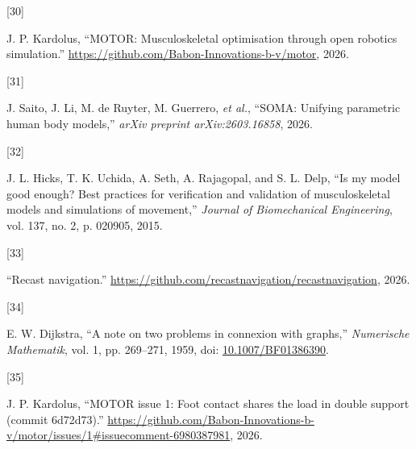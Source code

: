\documentclass[
  11pt,
]{article}
\newlength{\cslhangindent}
\newlength{\csllabelwidth}
\newenvironment{CSLReferences}[2] %
 {\begin{list}{}{%
  \setlength{\itemindent}{0pt}
  \setlength{\leftmargin}{0pt}
  \setlength{\parsep}{0pt}
  \ifodd #1
   \setlength{\leftmargin}{\cslhangindent}
   \setlength{\itemindent}{-1\cslhangindent}
  \fi
  \setlength{\itemsep}{#2\baselineskip}}}
 {\end{list}}
\newcommand{\CSLLeftMargin}[1]{\parbox[t]{\csllabelwidth}{\strut#1\strut}}
\newcommand{\CSLRightInline}[1]{\parbox[t]{\linewidth - \csllabelwidth}{\strut#1\strut}}
\begin{document}
\begin{CSLReferences}{0}{0}
\CSLLeftMargin{{[}30{]} }%
\CSLRightInline{J. P. Kardolus, {``{MOTOR}: Musculoskeletal optimisation
through open robotics simulation.''}
\url{https://github.com/Babon-Innovations-b-v/motor}, 2026.}

\CSLLeftMargin{{[}31{]} }%
\CSLRightInline{{J. Saito, J. Li, M. de Ruyter, M. Guerrero, \emph{et
al.}}, {``{SOMA}: Unifying parametric human body models,''} \emph{arXiv
preprint arXiv:2603.16858}, 2026.}

\CSLLeftMargin{{[}32{]} }%
\CSLRightInline{J. L. Hicks, T. K. Uchida, A. Seth, A. Rajagopal, and S.
L. Delp, {``Is my model good enough? Best practices for verification and
validation of musculoskeletal models and simulations of movement,''}
\emph{Journal of Biomechanical Engineering}, vol. 137, no. 2, p. 020905,
2015.}

\CSLLeftMargin{{[}33{]} }%
\CSLRightInline{{``Recast navigation.''}
\url{https://github.com/recastnavigation/recastnavigation}, 2026.}

\CSLLeftMargin{{[}34{]} }%
\CSLRightInline{E. W. Dijkstra, {``A note on two problems in connexion
with graphs,''} \emph{Numerische Mathematik}, vol. 1, pp. 269--271,
1959, doi:
\href{https://doi.org/10.1007/BF01386390}{10.1007/BF01386390}.}

\CSLLeftMargin{{[}35{]} }%
\CSLRightInline{J. P. Kardolus, {``{MOTOR} issue 1: Foot contact shares
the load in double support (commit 6d72d73).''}
\url{https://github.com/Babon-Innovations-b-v/motor/issues/1\#issuecomment-6980387981},
2026.}

\end{CSLReferences}
\end{document}
